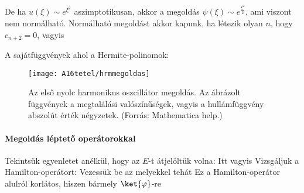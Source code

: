     De ha $u(\xi)\sim e^{\xi^2}$ aszimptotikusan, akkor a megoldás $\psi(\xi)\sim e^{\frac{\xi^2}{2}}$, ami viszont nem normálható.
   Normálható megoldást akkor kapunk, ha létezik olyan $n$, hogy $c_{n+2}=0$, vagyis
    
    A sajátfüggvények 
    ahol a Hermite-polinomok:
    \begin{figure}[ht!]
     \centering
     \texttt{[image: A16tetel/hrmmegoldas]}
     \caption{Az első nyolc harmonikus oszcillátor megoldás.
   Az ábrázolt függvények a megtalálási valószínűségek, vagyis a hullámfüggvény abszolút érték négyzetek. (Forrás: Mathematica help.)}
    \end{figure}
    
   \paragraph{Megoldás léptető operátorokkal}
    
    Tekintsük  egyenletet anélkül, hogy az $E$-t átjelöltük volna:
    Itt 
    vagyis
    Vizsgáljuk a Hamilton-operátort:
    Vezessük be az 
    melyekkel tehát
    Ez a Hamilton-operátor alulról korlátos, hiszen bármely $\ket{\varphi}$-re 
    
